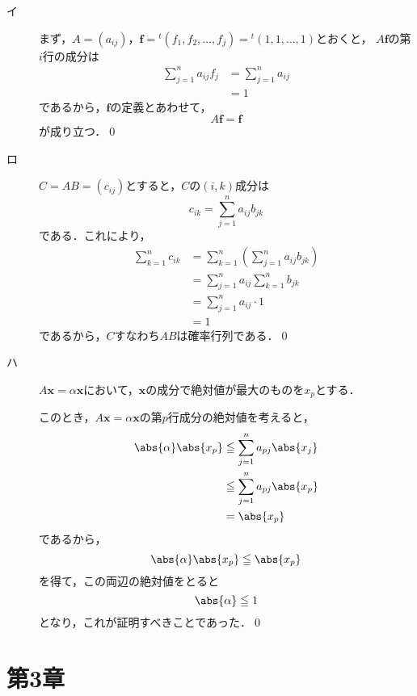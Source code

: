 \documentclass[uplatex,dvipdfmx,a4paper,10pt,fleqn]{jsarticle}
\begin{document}
\begin{leftbar}
    \begin{description}
        \item[イ] まず，$A=(a_{ij})$，$\bm{f} = {}^t (f_1 , f_2,\dots,f_j) ={}^t (1,1,\dots,1)$とおくと，
        $A \bm{f}$の第$i$行の成分は
        \begin{align*}
            \sum_{j=1}^{n} a_{ij} f_j &= \sum_{j=1}^{n} a_{ij} \\
            &=1 
        \end{align*}
        であるから，$\bm{f}$の定義とあわせて，
        \[
            A \bm{f} =\bm{f}
        \]
        が成り立つ．\qed 
        \item[ロ] $C =AB=(c_{ij})$とすると，$C$の$(i,k)$成分は
        \[
            c_{ik}  =\sum_{j=1}^{n} a_{ij} b_{jk}
        \]
        である．これにより，
        \begin{align*} 
            \sum_{k=1}^{n} c_{ik} & = \sum_{k=1}^{n} \left (\sum_{j=1}^{n} a_{ij} b_{jk}\right) \\
            & = \sum_{j=1}^{n} a_{ij} \sum_{k=1}^{n} b_{jk} \\
            & = \sum_{j=1}^{n} a_{ij} \cdot 1 \\
            & = 1
        \end{align*} 
        であるから，$C$すなわち$AB$は確率行列である．\qed
        \item[ハ] $ A \bm{x}=\alpha \bm{x}$において，$\bm{x}$の成分で絶対値が最大のものを$x_p$とする．
    
        このとき，$ A \bm{x} = \alpha \bm{x}$の第$p$行成分の絶対値を考えると，
        \begin{align*} 
            \abs{\alpha} \abs{x_p} &\leqq \sum_{j=1}^{n} a_{pj} \abs{x_j} \\
            & \leqq \sum_{j=1}^{n} a_{pj} \abs{x_p} \\
            & = \abs{x_p}
        \end{align*} 
        であるから，
        \[
            \abs{\alpha} \abs{x_p} \leqq \abs{x_p}
        \]
        を得て，この両辺の絶対値をとると
        \[
            \abs{\alpha} \leqq 1
        \]
        となり，これが証明すべきことであった．\qed
        \end{description}
    \end{leftbar}

    \newpage 


\section*{第3章}
\end{document}
